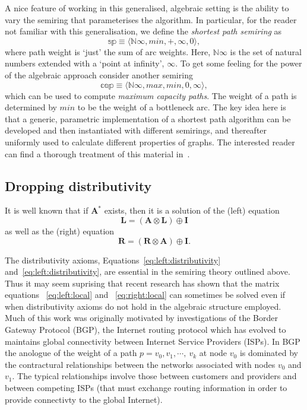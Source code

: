 A nice feature of working in this generalised, algebraic setting is
the ability to vary the semiring that parameterises the algorithm.
In particular, for the reader not familiar with this generalisation,
we define the \emph{shortest path semiring} as
\begin{equation}
\label{eq:def:sp}
\mathbb{sp} \equiv \langle\mathbb{N}{\infty}, min, +, \infty, 0\rangle,
\end{equation}
where path weight is `just' the sum of arc weights.
Here, $\mathbb{N}{\infty}$ is the set of natural numbers extended with a `point
at infinity', $\infty$.
To get some feeling for the power of the
algebraic approach consider another semiring
\begin{equation}
\label{eq:def:cap}
\mathbb{cap} \equiv \langle\mathbb{N}{\infty}, max, min, 0, \infty\rangle,
\end{equation}
which can be used to compute \emph{maximum capacity paths}.
The weight of a path is determined by $min$ to be the
weight of a bottleneck arc.
The key idea here is that a generic, parametric implementation of a shortest
path algorithm can be developed and then instantiated with
different semirings, and thereafter uniformly used to calculate different properties
of graphs.
The interested reader can find a thorough treatment of
this material in~\cite{gondran_graphs_2008}.

\subsection{Dropping distributivity}
\label{subsect.dropping.distributivity}

It is well known that if $\mathbf{A}^*$ exists, then it
is a solution of the (left) equation
\begin{equation}
\label{eq:left:local}
\mathbf{L} = (\mathbf{A}\otimes \mathbf{L}) \oplus \mathbf{I}
\end{equation}
as well as the (right) equation
\begin{equation}
\label{eq:right:local}
\mathbf{R} = (\mathbf{R}\otimes \mathbf{A}) \oplus \mathbf{I}.
\end{equation}

The distributivity axioms,
Equations~\ref{eq:left:distributivity} and~\ref{eq:left:distributivity},
are essential in the semiring theory outlined above.
Thus it may seem suprising that recent research has shown that
the matrix equations ~\ref{eq:left:local} and ~\ref{eq:right:local}
can sometimes be solved even if when
distributivity axioms do not hold in the algebraic structure employed.
Much of this work was originally motivated
by investigations of the Border Gateway Protocol (BGP),
the Internet routing protocol which has evolved to
maintains global connectivity between Internet Service Providers (ISPs).
In BGP the anologue of the weight of a path
$p = v_0, v_1, \cdots,\ v_k$ at node $v_0$
is dominated by the contractural relationships between
the networks associated with nodes $v_0$ and $v_1$.
The typical relationships involve those between customers
and providers and between competing ISPs (that must exchange
routing information in order to provide connectivty to
the global Internet).

